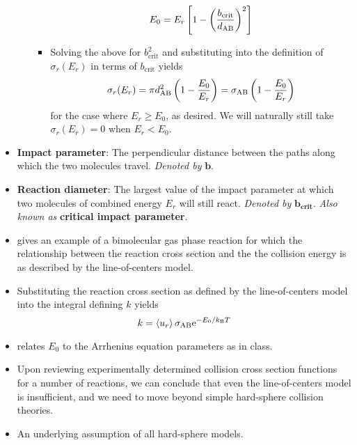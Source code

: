 \documentclass[../notes.tex]{subfiles}
\begin{document}
\begin{itemize}
\begin{itemize}
\begin{itemize}
            \begin{equation*}
                E_0 = E_r\left[ 1-\left( \frac{b_\text{crit}}{d_{\ce{A}\ce{B}}} \right)^2 \right]
            \end{equation*}
            \item Solving the above for $b_\text{crit}^2$ and substituting into the definition of $\sigma_r(E_r)$ in terms of $b_\text{crit}$ yields
            \begin{equation*}
                \sigma_r(E_r) = \pi d_{\ce{A}\ce{B}}^2\left( 1-\frac{E_0}{E_r} \right)
                = \sigma_{\ce{A}\ce{B}}\left( 1-\frac{E_0}{E_r} \right)
            \end{equation*}
            for the case where $E_r\geq E_0$, as desired. We will naturally still take $\sigma_r(E_r)=0$ when $E_r<E_0$.
        \end{itemize}
    \end{itemize}
    \item \textbf{Impact parameter}: The perpendicular distance between the paths along which the two molecules travel. \emph{Denoted by} $\bm{b}$.
    \item \textbf{Reaction diameter}: The largest value of the impact parameter at which two molecules of combined energy $E_r$ will still react. \emph{Denoted by} $\bm{b_\textbf{crit}}$. \emph{Also known as} \textbf{critical impact parameter}.
    \item \textcite{bib:McQuarrieSimon} gives an example of a bimolecular gas phase reaction for which the relationship between the reaction cross section and the the collision energy is as described by the line-of-centers model.
    \item Substituting the reaction cross section as defined by the line-of-centers model into the integral defining $k$ yields
    \begin{equation*}
        k = \prb{u_r}\sigma_{\ce{A}\ce{B}}\e[-E_0/\kB T]
    \end{equation*}
    \item \textcite{bib:McQuarrieSimon} relates $E_0$ to the Arrhenius equation parameters as in class.
    \item Upon reviewing experimentally determined collision cross section functions for a number of reactions, we can conclude that even the line-of-centers model is insufficient, and we need to move beyond simple hard-sphere collision theories.
    \item An underlying assumption of all hard-sphere models.
    \begin{itemize}

\end{itemize}
\end{itemize}
\end{document}
